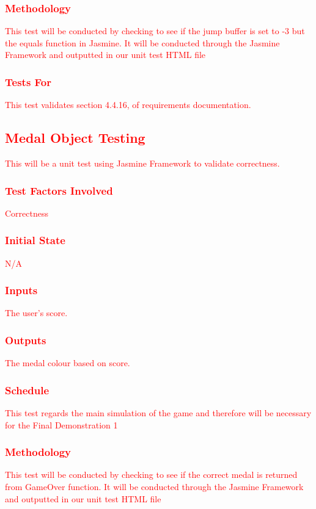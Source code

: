 \documentclass[11pt, oneside]{article}   	%
\begin{document}
\subsubsection{\textcolor{red}{Methodology}}
\textcolor{red}{This test will be conducted by checking to see if the jump buffer is set to -3 but the equals function in Jasmine. It will be conducted through the Jasmine Framework and outputted in our unit test HTML file}
\subsubsection{\textcolor{red}{Tests For}}
\textcolor{red}{This test validates section 4.4.16, of requirements documentation.}



\subsection{\textcolor{red}{Medal Object Testing}}
\textcolor{red}{This will be a unit test using Jasmine Framework to validate correctness.}
\subsubsection{\textcolor{red}{Test Factors Involved}}
\textcolor{red}{Correctness}
\subsubsection{\textcolor{red}{Initial State}}
\textcolor{red}{N/A}
\subsubsection{\textcolor{red}{Inputs}}
\textcolor{red}{The user's score.}
\subsubsection{\textcolor{red}{Outputs}}
\textcolor{red}{The medal colour based on score.}
\subsubsection{\textcolor{red}{Schedule}}
\textcolor{red}{This test regards the main simulation of the game and therefore will be necessary for the Final Demonstration 1}
\subsubsection{\textcolor{red}{Methodology}}
\textcolor{red}{This test will be conducted by checking to see if the correct medal is returned from GameOver function. It will be conducted through the Jasmine Framework and outputted in our unit test HTML file}
\end{document}
